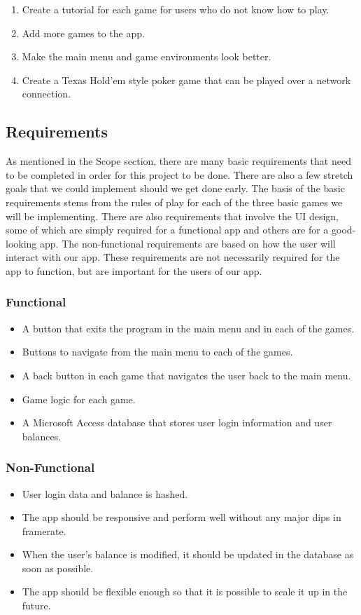 \documentclass[10pt,conference,onecolumn,compsoc]{IEEEtran}
\begin{document}
\begin{enumerate}
\item Create a tutorial for each game for users who do not know how to play.
\item Add more games to the app.
\item Make the main menu and game environments look better.
\item Create a Texas Hold'em style poker game that can be played over a network connection.
\end{enumerate}

\subsection{Requirements}
As mentioned in the Scope section, there are many basic requirements that need to be completed in order for this project to be done. There are also a few stretch goals that we could implement should we get done early. The basis of the basic requirements stems from the rules of play for each of the three basic games we will be implementing. There are also requirements that involve the UI design, some of which are simply required for a functional app and others are for a good-looking app. The non-functional requirements are based on how the user will interact with our app. These requirements are not necessarily required for the app to function, but are important for the users of our app.

\subsubsection{Functional}
\begin{itemize}
\item A button that exits the program in the main menu and in each of the games.
\item Buttons to navigate from the main menu to each of the games.
\item A back button in each game that navigates the user back to the main menu.
\item Game logic for each game.
\item A Microsoft Access database that stores user login information and user balances.
\end{itemize}

\subsubsection{Non-Functional}
\begin{itemize}
\item User login data and balance is hashed.
\item The app should be responsive and perform well without any major dips in framerate.
\item When the user's balance is modified, it should be updated in the database as soon as possible.
\item The app should be flexible enough so that it is possible to scale it up in the future.
\end{itemize}
\end{document}

